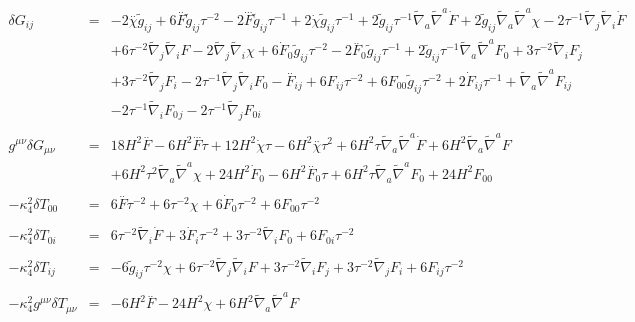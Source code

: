 \documentclass[10pt,letterpaper]{article}
\numberwithin{equation}{section}
\begin{document}
\begin{eqnarray}
\\  \nonumber\\ 
\delta G_{ij}&=& -2 \overset{..}{\chi} \tilde{g}_{ij} + 6 \overset{..}{F} \tilde{g}_{ij} \tau^{-2} - 2 \overset{...}{F} \tilde{g}_{ij} \tau^{-1} + 2 \dot{\chi} \tilde{g}_{ij} \tau^{-1} + 2 \tilde{g}_{ij} \tau^{-1} \tilde{\nabla}_{a}\tilde{\nabla}^{a}\dot{F} + 2 \tilde{g}_{ij} \tilde{\nabla}_{a}\tilde{\nabla}^{a}\chi - 2 \tau^{-1} \tilde{\nabla}_{j}\tilde{\nabla}_{i}\dot{F} \nonumber \\ 
&& + 6 \tau^{-2} \tilde{\nabla}_{j}\tilde{\nabla}_{i}F - 2 \tilde{\nabla}_{j}\tilde{\nabla}_{i}\chi +6 \dot{F}_{0}{} \tilde{g}_{ij} \tau^{-2} - 2 \overset{..}{F}_{0}{} \tilde{g}_{ij} \tau^{-1} + 2 \tilde{g}_{ij} \tau^{-1} \tilde{\nabla}_{a}\tilde{\nabla}^{a}F_{0}{} + 3 \tau^{-2} \tilde{\nabla}_{i}F_{j} \nonumber \\ 
&& + 3 \tau^{-2} \tilde{\nabla}_{j}F_{i} - 2 \tau^{-1} \tilde{\nabla}_{j}\tilde{\nabla}_{i}F_{0}{}- \overset{..}{F}_{ij} + 6 F_{ij} \tau^{-2} + 6 F_{00}{} \tilde{g}_{ij} \tau^{-2} + 2 \dot{F}_{ij} \tau^{-1} + \tilde{\nabla}_{a}\tilde{\nabla}^{a}F_{ij} \nonumber \\ 
&& - 2 \tau^{-1} \tilde{\nabla}_{i}F_{0}{}_{j} - 2 \tau^{-1} \tilde{\nabla}_{j}F_{0i}{}
\\  \nonumber\\ 
g^{\mu\nu}\delta G_{\mu\nu}&=& 18 H^2 \overset{..}{F} - 6 H^2 \overset{...}{F} \tau + 12 H^2 \dot{\chi} \tau - 6 H^2 \overset{..}{\chi} \tau^2 + 6 H^2 \tau \tilde{\nabla}_{a}\tilde{\nabla}^{a}\dot{F} + 6 H^2 \tilde{\nabla}_{a}\tilde{\nabla}^{a}F \nonumber \\ 
&& + 6 H^2 \tau^2 \tilde{\nabla}_{a}\tilde{\nabla}^{a}\chi +24 H^2 \dot{F}_{0}{} - 6 H^2 \overset{..}{F}_{0}{} \tau + 6 H^2 \tau \tilde{\nabla}_{a}\tilde{\nabla}^{a}F_{0}{}+24 H^2 F_{00}{}
\\ \nonumber\\
-\kappa^2_4 \delta T_{00}&=& 6 \overset{..}{F} \tau^{-2} + 6 \tau^{-2} \chi +6 \dot{F}_{0}{} \tau^{-2}+6 F_{00}{} \tau^{-2}
\\  \nonumber\\ 
-\kappa^2_4\delta T_{0i}&=& 6 \tau^{-2} \tilde{\nabla}_{i}\dot{F}+3 \dot{F}_{i} \tau^{-2} + 3 \tau^{-2} \tilde{\nabla}_{i}F_{0}{}+6 F_{0i}{} \tau^{-2}
\\  \nonumber\\ 
-\kappa^2_4\delta T_{ij}&=& -6 \tilde{g}_{ij} \tau^{-2} \chi + 6 \tau^{-2} \tilde{\nabla}_{j}\tilde{\nabla}_{i}F+3 \tau^{-2} \tilde{\nabla}_{i}F_{j} + 3 \tau^{-2} \tilde{\nabla}_{j}F_{i}+6 F_{ij} \tau^{-2}
\\ \nonumber\\
-\kappa^2_4 g^{\mu\nu}\delta T_{\mu\nu} &=& -6 H^2 \overset{..}{F} - 24 H^2 \chi + 6 H^2 \tilde{\nabla}_{a}\tilde{\nabla}^{a}F
\end{eqnarray}
%
%
%
\\ \\
\end{document}
